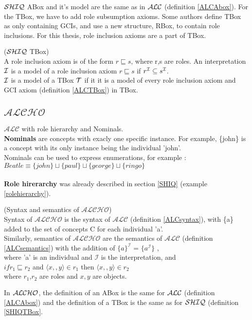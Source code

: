 $\mathcal{SHIQ}$ ABox and it's model are the same as in $\mathcal{ALC}$ (definition \ref{ALCAbox}). For the TBox, we have to add role subsumption axioms. 
Some authors define TBox as only containing GCIs, and use a new structure, RBox, to contain role inclusions. For this thesis, role inclusion axioms are a part of TBox.

\begin{mydef} \label{SHIQTBox} \cite{handbook} ($\mathcal{SHIQ}$ TBox) \\
A role inclusion axiom is of the form $r \sqsubseteq s$, where r,s
are roles. An interpretation $\mathcal{I}$ is a model of a role inclusion axiom  $r \sqsubseteq s$ if $r^{\mathcal{I}} \subseteq s^{\mathcal{I}}$.\\
$\mathcal{I}$ is a model of a TBox $\mathcal{T}$ if it it is a model of every role inclusion axiom and GCI axiom (definition \ref{ALCTBox}) in TBox.
\end{mydef}







\subsection{$\mathcal{ALCHO}$}
$\mathcal{ALC}$ with role hierarchy and Nominals.\\
\textbf{Nominals} are concepts with exacly one specific instance. For example, \{john\} is a concept with its only instance being the individual 'john'. \\
Nominals can be used to express enumerations, for example \cite{primer}: \\
   $Beatle \equiv \{john\} \sqcup  \{paul\} \sqcup  \{george\} \sqcup  \{ringo\} $\\
\\
\textbf{Role hirerarchy} was already described in section \ref{SHIQ} (example \ref{rolehierarchy}).
\begin{mydef} (Syntax and semantics of $\mathcal{ALCHO}$)\\
	Syntax of $\mathcal{ALCHO}$ is the syntax of $\mathcal{ALC}$ (definition \ref{ALCsyntax}), with \{a\} added to the set of concepts C for each individual 'a'.\\
	Similarly, semantics of $\mathcal{ALCHO}$ are the semantics of $\mathcal{ALC}$ (definition \ref{ALCsemantics}) with the addition of 
     $\{a\}^\mathcal{I}$ = $ \{ a^\mathcal{I} \} $ ,\\ 
     where 'a' is an individual and $ \mathcal{I}$ is the interpretation, and  \\
$ if r_1 \sqsubseteq r_2$ and $\langle x,,y \rangle \in r_1 $ then $\langle x,,y \rangle \in r_2 $ \\
  where $r_1$,$r_2$ are roles and $x,y$ are objects.  
\end{mydef} 
In $\mathcal{ALCHO}$, the definition of an ABox is the same for $\mathcal{ALC}$ (definition \ref{ALCAbox}) and the definition of a TBox is the same as for $\mathcal{SHIQ}$ (definition \ref{SHIQTBox}.
